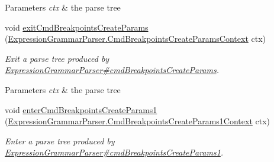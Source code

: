 \begin{DoxyCompactItemize}
\begin{DoxyCompactList}
\begin{DoxyParams}{Parameters}
{\em ctx} & the parse tree\\
\hline
\end{DoxyParams}
 \end{DoxyCompactList}\item 
void \hyperlink{classgov_1_1nasa_1_1jpf_1_1inspector_1_1server_1_1expression_1_1parser_1_1_expression_grammar_base_listener_a597c635dc191a6cf5e2be8cc1f934cfc}{exit\+Cmd\+Breakpoints\+Create\+Params} (\hyperlink{classgov_1_1nasa_1_1jpf_1_1inspector_1_1server_1_1expression_1_1parser_1_1_expression_grammar_pa40092569cc5b197b7a5caae27da04e05}{Expression\+Grammar\+Parser.\+Cmd\+Breakpoints\+Create\+Params\+Context} ctx)
\begin{DoxyCompactList}\small\item\em Exit a parse tree produced by \hyperlink{classgov_1_1nasa_1_1jpf_1_1inspector_1_1server_1_1expression_1_1parser_1_1_expression_grammar_parser_af2721b9a2421fbe474ff8614c667be8b}{Expression\+Grammar\+Parser\#cmd\+Breakpoints\+Create\+Params}.


\begin{DoxyParams}{Parameters}
{\em ctx} & the parse tree\\
\hline
\end{DoxyParams}
 \end{DoxyCompactList}\item 
void \hyperlink{classgov_1_1nasa_1_1jpf_1_1inspector_1_1server_1_1expression_1_1parser_1_1_expression_grammar_base_listener_a4fb997f8353624db2982c0c7b4ee611b}{enter\+Cmd\+Breakpoints\+Create\+Params1} (\hyperlink{classgov_1_1nasa_1_1jpf_1_1inspector_1_1server_1_1expression_1_1parser_1_1_expression_grammar_pa96543943a9acc7eb3cd37320a4fc3ee4}{Expression\+Grammar\+Parser.\+Cmd\+Breakpoints\+Create\+Params1\+Context} ctx)
\begin{DoxyCompactList}\small\item\em Enter a parse tree produced by \hyperlink{classgov_1_1nasa_1_1jpf_1_1inspector_1_1server_1_1expression_1_1parser_1_1_expression_grammar_parser_aa16584e37b631f4c0cdd1b148deda9df}{Expression\+Grammar\+Parser\#cmd\+Breakpoints\+Create\+Params1}.



\end{DoxyCompactList}
\end{DoxyCompactItemize}

